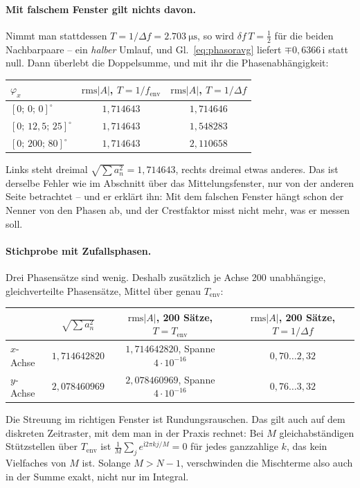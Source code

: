 \documentclass[11pt,a4paper]{article}
\begin{document}
\paragraph{Mit falschem Fenster gilt nichts davon.}
Nimmt man stattdessen $T=1/\Delta f = \SI{2.703}{\micro\second}$, so wird
$\delta\! f\,T = \tfrac12$ für die beiden Nachbarpaare -- ein \emph{halber}
Umlauf, und Gl.~\eqref{eq:phasoravg} liefert $\mp0{,}6366\,\mathrm{i}$ statt
null. Dann überlebt die Doppelsumme, und mit ihr die Phasenabhängigkeit:
\begin{center}
\begin{tabular}{lcc}
  \toprule
  $\varphi_x$ & $\mathrm{rms}|A|$, $T=1/f_\mathrm{env}$ & $\mathrm{rms}|A|$, $T=1/\Delta f$\\
  \midrule
  $[0;\,0;\,0]^\circ$        & $1{,}714643$ & $1{,}714646$\\
  $[0;\,12{,}5;\,25]^\circ$  & $1{,}714643$ & $1{,}548283$\\
  $[0;\,200;\,80]^\circ$     & $1{,}714643$ & $2{,}110658$\\
  \bottomrule
\end{tabular}
\end{center}
Links steht dreimal $\sqrt{\sum a_n^2}=1{,}714643$, rechts dreimal etwas
anderes. Das ist derselbe Fehler wie im Abschnitt über das Mittelungsfenster,
nur von der anderen Seite betrachtet -- und er erklärt ihn: Mit dem falschen
Fenster hängt schon der Nenner von den Phasen ab, und der Crestfaktor misst
nicht mehr, was er messen soll.

\paragraph{Stichprobe mit Zufallsphasen.}
Drei Phasensätze sind wenig. Deshalb zusätzlich je Achse 200 unabhängige,
gleichverteilte Phasensätze, Mittel über genau $T_\mathrm{env}$:
\begin{center}
\begin{tabular}{@{}lccc@{}}
  \toprule
  & $\sqrt{\sum a_n^2}$ & $\mathrm{rms}|A|$, 200 Sätze, $T=T_\mathrm{env}$ & $\mathrm{rms}|A|$, 200 Sätze, $T=1/\Delta f$\\
  \midrule
  $x$-Achse & $1{,}714642820$ & $1{,}714642820$, Spanne $4\cdot10^{-16}$ & $0{,}70 \dots 2{,}32$\\
  $y$-Achse & $2{,}078460969$ & $2{,}078460969$, Spanne $4\cdot10^{-16}$ & $0{,}76 \dots 3{,}32$\\
  \bottomrule
\end{tabular}
\end{center}
Die Streuung im richtigen Fenster ist Rundungsrauschen. Das gilt auch auf dem
diskreten Zeitraster, mit dem man in der Praxis rechnet: Bei $M$
gleichabständigen Stützstellen über $T_\mathrm{env}$ ist
$\frac1M\sum_j e^{\mathrm{i}2\pi k j/M}=0$ für jedes ganzzahlige $k$, das
kein Vielfaches von $M$ ist. Solange $M > N-1$, verschwinden die Mischterme
also auch in der Summe exakt, nicht nur im Integral.
\end{document}
